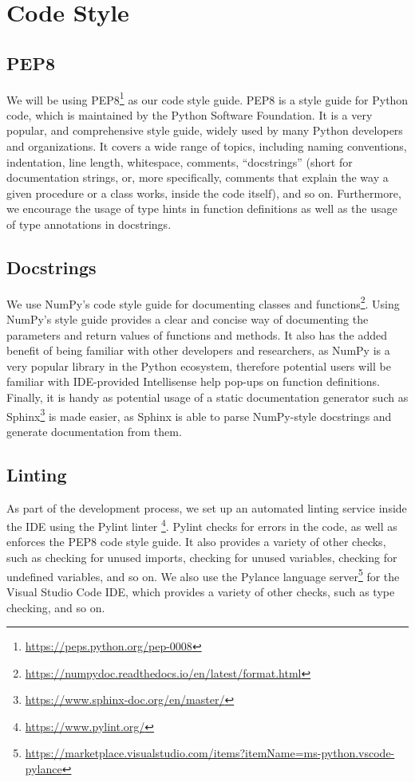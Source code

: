 \section{Code Style}
\subsection{PEP8}
We will be using PEP8\footnote{\url{https://peps.python.org/pep-0008}} \citep{pep8} as our code style guide. PEP8 is a style guide for Python code, which is maintained by the Python Software Foundation. It is a very popular, and comprehensive style guide, widely used by many Python developers and organizations. It covers a wide range of topics, including naming conventions, indentation, line length, whitespace, comments, ``docstrings'' (short for documentation strings, or, more specifically, comments that explain the way a given procedure or a class works, inside the code itself), and so on. Furthermore, we encourage the usage of type hints in function definitions as well as the usage of type annotations in docstrings.
\subsection{Docstrings}
We use NumPy's code style guide for documenting classes and functions\footnote{\url{https://numpydoc.readthedocs.io/en/latest/format.html}}. Using NumPy's style guide provides a clear and concise way of documenting the parameters and return values of functions and methods. It also has the added benefit of being familiar with other developers and researchers, as NumPy is a very popular library in the Python ecosystem, therefore potential users will be familiar with IDE-provided Intellisense help pop-ups on function definitions. Finally, it is handy as potential usage of a static documentation generator such as Sphinx\footnote{\url{https://www.sphinx-doc.org/en/master/}} is made easier, as Sphinx is able to parse NumPy-style docstrings and generate documentation from them.

\subsection{Linting}
As part of the development process, we set up an automated linting service inside the IDE using the Pylint linter \footnote{\url{https://www.pylint.org/}}. Pylint checks for errors in the code, as well as enforces the PEP8 code style guide. It also provides a variety of other checks, such as checking for unused imports, checking for unused variables, checking for undefined variables, and so on. We also use the Pylance language server\footnote{\url{https://marketplace.visualstudio.com/items?itemName=ms-python.vscode-pylance}} for the Visual Studio Code IDE, which provides a variety of other checks, such as type checking, and so on.


